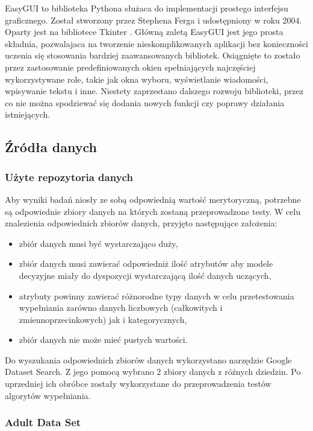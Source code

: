 \documentclass[12pt,twoside]{article}
\begin{document}
EasyGUI to biblioteka Pythona służaca do implementacji prostego interfejsu graficznego.
Został stworzony przez Stephena Ferga i udostępniony w roku 2004. Oparty jest na bibliotece Tkinter \cite{tkinter}.
Główną zaletą EasyGUI jest jego prosta składnia, pozwalajaca na tworzenie nieskomplikowanych aplikacji bez
konieczności uczenia się stosowania bardziej zaawansowanych bibliotek.
Osiągnięte to zostało przez zastosowanie predefiniowanych okien spełniających najczęściej wykorzystywane role,
takie jak okna wyboru, wyświetlanie wiadomości, wpisywanie tekstu i inne.
Niestety zaprzestano dalszego rozwoju biblioteki, przez co nie można spodziewać się dodania nowych funkcji
czy poprawy działania istniejących. \cite{easygui}

\subsection{Źródła danych}

\subsubsection{Użyte repozytoria danych}

Aby wyniki badań niosły ze sobą odpowiednią wartość merytoryczną,
potrzebne są odpowiednie zbiory danych na których zostaną przeprowadzone testy.
W celu znalezienia odpowiednich zbiorów danych, przyjęto następujące założenia:

\begin{itemize}[label=-,labelsep=0.4cm, leftmargin=1.25cm]
    \item zbiór danych musi być wystarczająco duży,
    \item zbiór danych musi zawierać odpowiedniż ilość atrybutów aby modele decyzyjne miały
          do dyspozycji wystarczającą ilość danych uczących,
    \item atrybuty powinny zawierać różnorodne typy danych w celu przetestowania wypełniania zarówno danych
          liczbowych (całkowitych i zmiennoprzecinkowych) jak i kategorycznych,
    \item zbiór danych nie może mieć pustych wartości.
\end{itemize}

Do wyszukania odpowiednich zbiorów danych wykorzystano narzędzie Google Dataset Search. \cite{googlesearch}\cite{googlesearch2}
Z jego pomocą wybrano 2 zbiory danych z róźnych dziedzin.
Po uprzedniej ich obróbce zostały wykorzystane do przeprowadzenia testów algorytów wypełniania.
\subsubsection{Adult Data Set}
\end{document}
